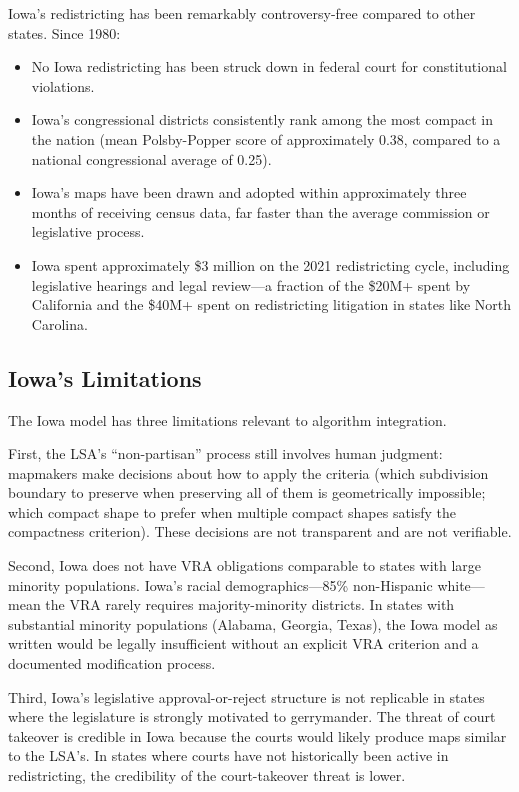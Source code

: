 Iowa's redistricting has been remarkably controversy-free compared to other states. Since 1980:
\begin{itemize}
  \item No Iowa redistricting has been struck down in federal court for constitutional violations.
  \item Iowa's congressional districts consistently rank among the most compact in the nation (mean Polsby-Popper score of approximately 0.38, compared to a national congressional average of 0.25).
  \item Iowa's maps have been drawn and adopted within approximately three months of receiving census data, far faster than the average commission or legislative process.
  \item Iowa spent approximately \$3 million on the 2021 redistricting cycle, including legislative hearings and legal review---a fraction of the \$20M+ spent by California and the \$40M+ spent on redistricting litigation in states like North Carolina.
\end{itemize}

\subsection{Iowa's Limitations}

The Iowa model has three limitations relevant to algorithm integration.

First, the LSA's ``non-partisan'' process still involves human judgment: mapmakers make decisions about how to apply the criteria (which subdivision boundary to preserve when preserving all of them is geometrically impossible; which compact shape to prefer when multiple compact shapes satisfy the compactness criterion). These decisions are not transparent and are not verifiable.

Second, Iowa does not have VRA obligations comparable to states with large minority populations. Iowa's racial demographics---85\% non-Hispanic white---mean the VRA rarely requires majority-minority districts. In states with substantial minority populations (Alabama, Georgia, Texas), the Iowa model as written would be legally insufficient without an explicit VRA criterion and a documented modification process.

Third, Iowa's legislative approval-or-reject structure is not replicable in states where the legislature is strongly motivated to gerrymander. The threat of court takeover is credible in Iowa because the courts would likely produce maps similar to the LSA's. In states where courts have not historically been active in redistricting, the credibility of the court-takeover threat is lower.

